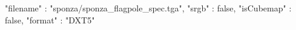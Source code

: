 { 
	"filename" : "sponza/sponza_flagpole_spec.tga", 
	"srgb" : false,
	"isCubemap" : false,
	"format" : "DXT5"
}